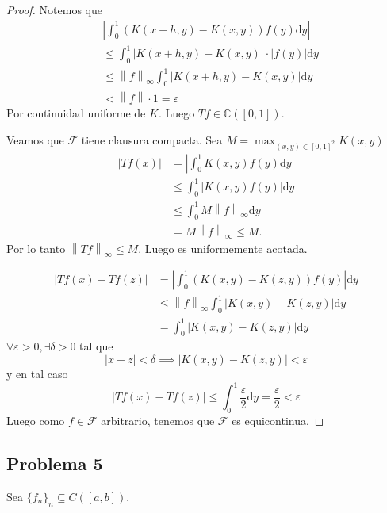 \documentclass{article}
\theoremstyle{definition}
\theoremstyle{remark}
\numberwithin{equation}{section}
\newcommand{\C}{\mathbb{C}}
\newcommand{\Fcal}{\mathcal{F}}
\renewcommand{\d}{\mathrm{d}}
\newcommand{\dd}{\delta} %
\newcommand{\e}{\varepsilon}
\newcommand{\oo}{\infty}
\newcommand{\abs}[1]{\left| #1 \right|}
\newcommand{\norm}[1]{\left\lVert #1 \right\rVert}
\newcommand{\ds}{\displaystyle}
\begin{document}
\begin{proof}
  Notemos que
  \begin{align*}
    &\abs{\int_0^1 (K(x+h,y) - K(x,y)) f(y) \d y} \\
    &\leq \int_0^1 \abs{K(x+h,y) - K(x,y)} \cdot \abs{f(y)} \d y \\
    &\leq \norm{f}_\oo \int_0^1 \abs{K(x+h,y) - K(x,y)} \d y \\
    &< \norm{f} \cdot 1 = \e
  \end{align*}
  Por continuidad uniforme de $K$. Luego $Tf \in \C([0,1])$.

  Veamos que $\Fcal$ tiene clausura compacta.
  Sea $\ds M = \max_{(x,y) \in [0,1]^2} K(x,y)$
  \begin{align*}
    \abs{Tf(x)} &= \abs{\int_0^1 K(x,y) f(y) \d y} \\
    &\leq \int_0^1 \abs{K(x,y) f(y)} \d y \\
    &\leq \int_0^1 M \norm{f}_\oo \d y \\
    &= M \norm{f}_\oo \leq M.
  \end{align*}
  Por lo tanto $\norm{Tf}_\oo \leq M$. Luego es uniformemente acotada.

  \begin{align*}
    \abs{Tf(x) - Tf(z)} 
    &= \abs{\int_0^1 (K(x,y) - K(z,y)) f(y)} \d y \\
    &\leq \norm{f}_\oo \int_0^1 \abs{K(x,y) - K(z,y)} \d y \\
    &= \int_0^1 \abs{K(x,y) - K(z,y)} \d y
  \end{align*}
  $\forall \e>0, \exists \dd>0$ tal que
  \[\abs{x-z} < \dd \implies \abs{K(x,y) - K(z,y)} < \e\]
  y en tal caso
  \[\abs{Tf(x) - Tf(z)} \leq \int_0^1 \frac\e2 \d y = \frac\e2 < \e\]
  Luego como $f \in \Fcal$ arbitrario, tenemos que $\Fcal$ es equicontinua.
\end{proof}

\newpage
\subsection{Problema 5}

Sea $\{f_n\}_n \subseteq C([a,b])$.
\end{document}
